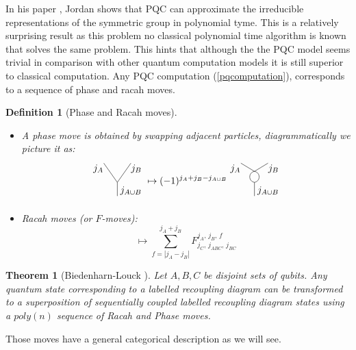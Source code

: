 \documentclass{article}
\newtheorem{definition}{Definition}
\newtheorem{theorem}{Theorem}
\begin{document}
In his paper \cite{Jordan09}, Jordan shows that PQC can approximate the irreducible representations of the symmetric group in polynomial tyme. This is a relatively surprising result as this problem no classical polynomial time algorithm is known that solves the same problem. This hints that although the the PQC model seems trivial in comparison with other quantum computation models it is still superior to classical computation. Any PQC computation (\ref{pqcomputation}), corresponds to a sequence of phase and racah moves.
\begin{definition}[Phase and Racah moves]
	\begin{itemize}
		\item A phase move is obtained by swapping adjacent particles, diagrammatically we picture it as:
		\begin{equation}
		\begin{gathered}
		\begin{tikzpicture}
		\node (0) at (0.5, -0.3) {$j_{A\cup B}$};
		\node (0) at (-0.7, 0.5) {$j_A$};
		\node (0) at (0.7, 0.5) {$j_B$};
		\draw (-0.5, 0.7)--(0,0)--(0,-0.5);
		\draw (0.5, 0.7)--(0,0);
		\end{tikzpicture}
		\end{gathered}
		\mapsto
		(-1)^{j_A+j_B-j_{A \cup B}}
		\begin{gathered}
		\begin{tikzpicture}
		\node (0) at (0.5, -0.3) {$j_{A\cup B}$};
		\node (0) at (-0.7, 0.5) {$j_A$};
		\node (0) at (0.7, 0.5) {$j_B$};
		\draw [bend right=80, looseness=1.5] (0,0) to (0,0.4);
		\draw [bend left=80, looseness=1.5] (0,0) to (0,0.4);
		\draw (0,0)--(0,-0.5);
		\draw (0.5, 0.7)--(0,0.4)--(-0.5, 0.7);
		\end{tikzpicture}
		\end{gathered}
		\end{equation}
		\item Racah moves (or $F$-moves):
		\begin{equation}
		\mapsto \sum_{f = |j_A - j_B|}^{j_A+j_B}  F^{j_A,\, j_B, \, f}_{j_C, \, j_{ABC}, \, j_{BC}} 
		\end{equation}
	\end{itemize}
\end{definition}
\begin{theorem}[Biedenharn-Louck \cite{Aquilanti09}] 
	Let $A,B,C$ be disjoint sets of qubits.
	Any quantum state corresponding to a labelled recoupling diagram can be transformed to a superposition of sequentially coupled labelled recoupling diagram states using a $poly(n)$ sequence of Racah and Phase moves.
\end{theorem}
Those moves have a general categorical description as we will see.
\end{document}
